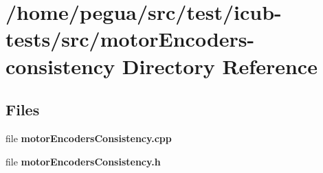 \section{/home/pegua/src/test/icub-\/tests/src/motor\-Encoders-\/consistency Directory Reference}
\label{dir_ff120bfd69174aceba0b7c2c1b4a03e3}
\subsection*{Files}
\begin{DoxyCompactItemize}
\item 
file {\bfseries motor\-Encoders\-Consistency.\-cpp}
\item 
file {\bfseries motor\-Encoders\-Consistency.\-h}
\end{DoxyCompactItemize}
